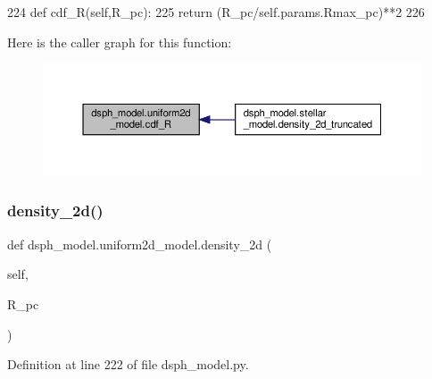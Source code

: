 \begin{DoxyCode}
224     \textcolor{keyword}{def }cdf\_R(self,R\_pc):
225         \textcolor{keywordflow}{return} (R\_pc/self.params.Rmax\_pc)**2    
226 
\end{DoxyCode}
Here is the caller graph for this function\+:\nopagebreak
\begin{figure}[H]
\begin{center}
\leavevmode
\includegraphics[width=350pt]{de/daa/classdsph__model_1_1uniform2d__model_a2c038957a1031356eb5e011a8644df2d_icgraph}
\end{center}
\end{figure}
\mbox{\label{classdsph__model_1_1uniform2d__model_aff33b4418158947e106a097c3a58a67e}} 
\subsubsection{\texorpdfstring{density\+\_\+2d()}{density\_2d()}}
{\footnotesize\ttfamily def dsph\+\_\+model.\+uniform2d\+\_\+model.\+density\+\_\+2d (\begin{DoxyParamCaption}\item[{}]{self,  }\item[{}]{R\+\_\+pc }\end{DoxyParamCaption})}



Definition at line 222 of file dsph\+\_\+model.\+py.


